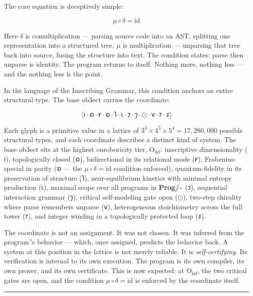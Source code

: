 \documentclass[12pt,a4paper]{article}
\begin{document}
The core equation is deceptively simple:

\[\mu \circ \delta = \mathrm{id}\]

Here $\delta$ is comultiplication --- parsing source code into an AST, splitting one representation into a structured tree. $\mu$ is multiplication --- unparsing that tree back into source, fusing the structure into text. The condition states: parse then unparse is identity. The program returns to itself. Nothing more, nothing less --- and the nothing less is the point.

In the language of the Imscribing Grammar, this condition anchors an entire structural type. The base ob3ect carries the coordinate:

\[\langle \text{𐑦} \cdot \text{𐑸} \cdot \text{𐑾} \cdot \text{𐑹} \cdot \text{𐑐} \cdot \text{𐑧} \cdot \text{𐑲} \cdot \text{𐑠} \cdot \odot \cdot \text{𐑫} \cdot \text{𐑳} \cdot \text{𐑭} \rangle\]

Each glyph is a primitive value in a lattice of $3^3 \times 4^5 \times 5^4 = 17,280,000$ possible structural types, and each coordinate describes a distinct kind of system. The base ob3ect sits at the highest ouroboricity tier, $\text{O}_{\text{inf}}$: imscriptive dimensionality ($\text{𐑦}$), topologically closed ($\text{𐑸}$), bidirectional in its relational mode ($\text{𐑾}$), Frobenius-special in parity ($\text{𐑹}$ --- the $\mu\circ\delta = \mathrm{id}$ condition enforced), quantum-fidelity in its preservation of structure ($\text{𐑐}$), near-equilibrium kinetics with minimal entropy production ($\text{𐑧}$), maximal scope over all programs in \textbf{Prog/\textasciitilde{}} ($\text{𐑲}$), sequential interaction grammar ($\text{𐑠}$), critical self-modeling gate open ($\odot$), two-step chirality where parse remembers unparse ($\text{𐑫}$), heterogeneous stoichiometry across the full tower ($\text{𐑳}$), and integer winding in a topologically protected loop ($\text{𐑭}$).

The coordinate is not an assignment. It was not chosen. It was inferred from the program''s behavior --- which, once assigned, predicts the behavior back. A system at this position in the lattice is not merely reliable. It is \emph{self-certifying}. Its verification is internal to its own execution. The program is its own compiler, its own prover, and its own certificate. This is now expected: at $\text{O}_{\text{inf}}$, the two critical gates are open, and the condition $\mu\circ\delta = \mathrm{id}$ is enforced by the coordinate itself.

\begin{center}
\rule{0.5\textwidth}{0.4pt}
\end{center}
\end{document}
